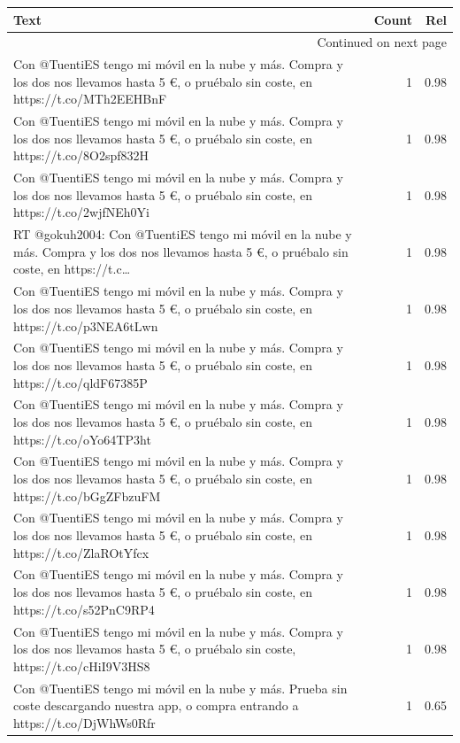 \begin{longtable}{p{12.5cm}rr}
\toprule
Text & Count & Rel \\
\midrule
\endhead
\midrule
\multicolumn{3}{r}{{Continued on next page}} \\
\midrule
\endfoot

\bottomrule
\endlastfoot
Con @TuentiES tengo mi móvil en la nube y más. Compra y los dos nos llevamos hasta 5 €, o pruébalo sin coste, en https://t.co/MTh2EEHBnF & 1 & 0.98 \\
Con @TuentiES tengo mi móvil en la nube y más. Compra y los dos nos llevamos hasta 5 €, o pruébalo sin coste, en https://t.co/8O2spf832H & 1 & 0.98 \\
Con @TuentiES tengo mi móvil en la nube y más. Compra y los dos nos llevamos hasta 5 €, o pruébalo sin coste, en https://t.co/2wjfNEh0Yi & 1 & 0.98 \\
RT @gokuh2004: Con @TuentiES tengo mi móvil en la nube y más. Compra y los dos nos llevamos hasta 5 €, o pruébalo sin coste, en https://t.c… & 1 & 0.98 \\
Con @TuentiES tengo mi móvil en la nube y más. Compra y los dos nos llevamos hasta 5 €, o pruébalo sin coste, en https://t.co/p3NEA6tLwn & 1 & 0.98 \\
Con @TuentiES tengo mi móvil en la nube y más. Compra y los dos nos llevamos hasta 5 €, o pruébalo sin coste, en https://t.co/qldF67385P & 1 & 0.98 \\
Con @TuentiES tengo mi móvil en la nube y más. Compra y los dos nos llevamos hasta 5 €, o pruébalo sin coste, en https://t.co/oYo64TP3ht & 1 & 0.98 \\
Con @TuentiES tengo mi móvil en la nube y más. Compra y los dos nos llevamos hasta 5 €, o pruébalo sin coste, en https://t.co/bGgZFbzuFM & 1 & 0.98 \\
Con @TuentiES tengo mi móvil en la nube y más. Compra y los dos nos llevamos hasta 5 €, o pruébalo sin coste, en https://t.co/ZlaROtYfcx & 1 & 0.98 \\
Con @TuentiES tengo mi móvil en la nube y más. Compra y los dos nos llevamos hasta 5 €, o pruébalo sin coste, en https://t.co/s52PnC9RP4 & 1 & 0.98 \\
Con @TuentiES tengo mi móvil en la nube y más. Compra y los dos nos llevamos hasta 5 €, o pruébalo sin coste, https://t.co/cHiI9V3HS8 & 1 & 0.98 \\
Con @TuentiES tengo mi móvil en la nube y más. Prueba sin coste descargando nuestra app, o compra entrando a  https://t.co/DjWhWs0Rfr & 1 & 0.65 \\

\end{longtable}
